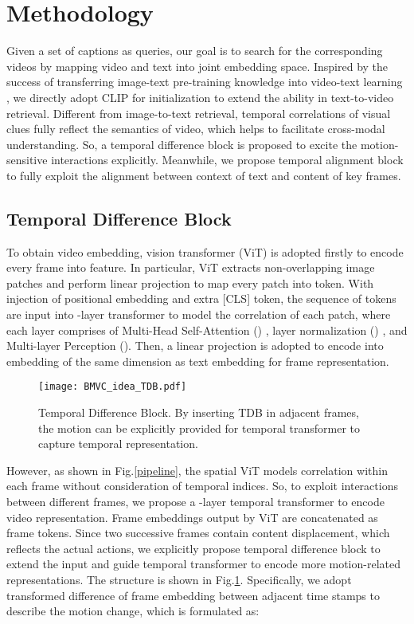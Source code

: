 \documentclass[final]{cvpr}
\begin{document}
\section{Methodology}

Given a set of captions as queries, our goal is to search for the corresponding videos by mapping video and text into joint embedding space. Inspired by the success of transferring image-text pre-training knowledge into video-text learning \cite{lei2021less}, we directly adopt CLIP \cite{radford2021learning} for initialization to extend the ability in text-to-video retrieval. Different from image-to-text retrieval, temporal correlations of visual clues fully reflect the semantics of video, which helps to facilitate cross-modal understanding. 
So, a temporal difference block is proposed to excite the motion-sensitive interactions explicitly. Meanwhile, we propose temporal alignment block to fully exploit the alignment between context of text and content of key frames.



\subsection{Temporal Difference Block}
To obtain video embedding, vision transformer (ViT) \cite{dosovitskiy2020image} is adopted firstly to encode every frame into feature. In particular, ViT extracts  non-overlapping image patches and perform linear projection to map every patch into  token. With injection of positional embedding and extra [CLS] token, the sequence of tokens  are input into -layer transformer to model the correlation of each patch, where each layer  comprises of Multi-Head Self-Attention () \cite{vaswani2017attention}, layer normalization () \cite{ba2016layer}, and Multi-layer Perception (). Then, a linear projection is adopted to encode  into embedding of the same dimension as text embedding for frame representation. 
\begin{figure}
        \begin{center}
            \texttt{[image: BMVC\_idea\_TDB.pdf]}
        \end{center}
\caption{Temporal Difference Block. By inserting TDB in adjacent frames, the motion can be explicitly provided for temporal transformer to capture temporal representation.}
        \label{TDB}  
\end{figure}

However, as shown in Fig.\ref{pipeline}, the spatial ViT models correlation within each frame without consideration of temporal indices. So, to exploit interactions between different frames, we propose a -layer temporal transformer to encode video representation. Frame embeddings output by ViT are concatenated as frame tokens. Since two successive frames contain content displacement, which reflects the actual actions, we explicitly propose 
temporal difference block to extend the input and guide temporal transformer to encode more motion-related representations. The structure is shown in Fig.\ref{TDB}. Specifically, we adopt transformed difference of frame embedding between adjacent time stamps to describe the motion change, which is formulated as:
\end{document}
